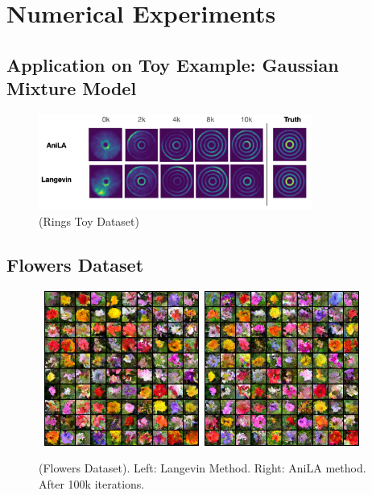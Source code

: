 \documentclass{article}
\begin{document}
\clearpage
\section{Numerical Experiments}\label{sec:numericals}




\subsection{Application on Toy Example: Gaussian Mixture Model}

\begin{figure}[H]
\begin{center}
\includegraphics[width=0.8\textwidth]{figs/rings}
\caption{(Rings Toy Dataset) }
\label{fig:results}
\end{center}
\end{figure}


\subsection{Flowers Dataset}

\begin{figure}[H]
    \begin{center}
        \mbox{
        \includegraphics[width=2in]{figs/flowerslangevin}
        \includegraphics[width=2in]{figs/flowersanila}
        }
    \end{center}
    \vspace{-0.1in}
	\caption{(Flowers Dataset). Left: Langevin Method. Right: AniLA method. After 100k iterations.}
	\label{fig:flowers}
\end{figure}
\end{document}
